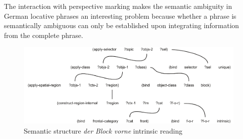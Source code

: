 The interaction with perspective marking makes the semantic 
ambiguity in German locative phrases an interesting problem
because whether a phrase is semantically ambiguous can only be established upon
integrating information from the complete phrase.

\begin{figure}
\begin{center}
\includegraphics[width=.8\textwidth]{figs/der-block-vorne-semantic-structure-intrinsic}
\caption[Semantic structure of \textit{der Block vorne} (`the block in front') -- intrinsic]{Semantic structure \textit{der Block vorne} intrinsic reading}
\label{f:der-block-vorne-semantic-structure-intrinsic}
\end{center}
\end{figure}

